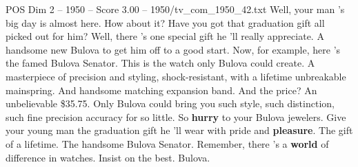 \begin{textsample}{POS Dim 2 – 1950 – Score 3.00 – 1950/tv\_com\_1950\_42.txt}  \label{ex:f2_pos_011}
Well, your man 's big day is almost here.
How about it?
Have you got that graduation gift all picked out for him?
Well, there 's one special gift he 'll really appreciate.
A handsome new Bulova to get him off to a good start.
Now, for example, here 's the famed Bulova Senator.
This is the watch only Bulova could create.
A masterpiece of precision and styling, shock-resistant, with a lifetime unbreakable mainspring.
And handsome matching expansion band.
And the price?
An unbelievable \$35.75.
Only Bulova could bring you such style, such distinction, such fine precision accuracy for so little.
So \textbf{hurry} to your Bulova jewelers.
Give your young man the graduation gift he 'll wear with pride and \textbf{pleasure}.
The gift of a lifetime.
The handsome Bulova Senator.
Remember, there 's a \textbf{world} of difference in watches.
Insist on the best.
Bulova.

\end{textsample}
